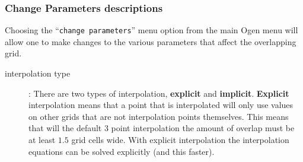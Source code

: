 \subsubsection{Change Parameters descriptions}
 
\newlength{\changeParametersIncludeArgIndent}
 
 Choosing the ``{\tt change parameters}'' menu option from the main Ogen menu will 
 allow one to make changes to the various parameters that affect the overlapping grid.
 
 \begin{description}
  \item[interpolation type] : There are two types of interpolation,
     {\bf explicit} and {\bf implicit}.  {\bf Explicit} interpolation means
     that a point that is interpolated will only use values on other grids
     that are not interpolation points themselves.  This means that will
     the default 3 point interpolation the amount of overlap must be at
     least $1.5$ grid cells wide. With explicit interpolation the
     interpolation equations can be solved explicitly (and this faster).
     

\end{description}

